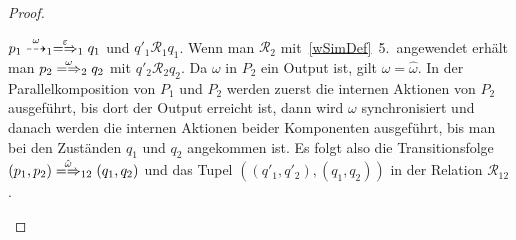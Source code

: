 \begin{proof}
\begin{enumerate}
\begin{itemize}
          $p_1\may[\omega]_1 \weakmay[\varepsilon]_1 q_1$ und $q'_1
          \mathcal{R}_1 q_1$. Wenn man $\mathcal{R}_2$ mit~\ref{wSimDef}~5.\
          angewendet erhält man $p_2 \weakmay[\omega]_2 q_2$ mit
          $q'_2\mathcal{R}_2 q_2$. Da $\omega$ in $P_2$ ein Output ist, gilt
          $\omega =\hat{\omega}$. In der Parallelkomposition von $P_1$ und
          $P_2$ werden zuerst die internen Aktionen von $P_2$ ausgeführt, bis
          dort der Output erreicht ist, dann wird $\omega$ synchronisiert und
          danach werden die internen Aktionen beider Komponenten ausgeführt,
          bis man bei den Zuständen $q_1$ und $q_2$ angekommen ist. Es folgt
          also die Transitionsfolge $(p_1,p_2) \weakmay[\hat{\omega}]_{12}
          (q_1,q_2)$ und das Tupel $((q'_1,q'_2),(q_1,q_2))$ in der Relation
          $\mathcal{R}_{12}$.
      \end{itemize}
  \end{enumerate}
\end{proof}


